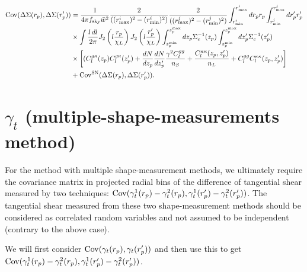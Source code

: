 \documentclass[onecolumn,amsmath,aps,fleqn, superscriptaddress]{revtex4}
\begin{document}
\begin{align}
{\rm Cov}(\Delta \Sigma(r_p), \Delta \Sigma(r_p^\prime)) &= \frac{1}{4\pi f_{\rm sky}\bar{w}^2}\frac{2}{((r^i_{\rm max})^2 - (r^i_{\rm min})^2)}\frac{2}{((r^j_{\rm max})^2 - (r^j_{\rm min})^2)} \int_{r^i_{\rm min}}^{r^i_{\rm max}} dr_p r_p \int_{r^j_{\rm min}}^{r^j_{\rm max}} dr_p^\prime r_p^\prime \nonumber \\ &\times\int \frac{l \, dl}{2\pi} J_2\left(l \frac{r_p}{\chi_L}\right) J_2 \left(l \frac{r_p^\prime}{\chi_L}\right) \int_{z_p^{\rm min}}^{z_p^{\rm max}} d z_p \Sigma_c^{-1}(z_p) \int_{z_p^{\rm min}}^{z_p^{\rm max}} dz_p^\prime \Sigma_c^{-1}(z_p^\prime)\nonumber \\ &\times \left[ (C_l^{g \kappa}(z_p)C_l^{g \kappa}(z_p^\prime)  + \frac{dN}{dz_p}\frac{dN}{dz_p^\prime}\frac{ \gamma^2 C_l^{gg}}{n_S} + \frac{C_l^{\kappa \kappa}(z_p, z_p^\prime)}{n_L} + C_l^{gg} C_l^{\kappa \kappa}(z_p, z_p^\prime)\right]\nonumber \\  &+ {\rm Cov}^{\rm SN}(\Delta \Sigma(r_p), \Delta \Sigma(r_p^\prime)).
\label{covDSDS_rpavg}
\end{align}

\section{$\gamma_t$ (multiple-shape-measurements method)}
For the method with multiple shape-measurement methods, we ultimately require the covariance matrix in projected radial bins of the difference of tangential shear measured by two techniques: ${\rm Cov}(\gamma_t^1(r_p) - \gamma_t^2(r_p), \gamma_t^1(r_p^\prime) - \gamma_t^2(r_p^\prime))$. The tangential shear measured from these two shape-measurement methods should be considered as correlated random variables and not assumed to be independent (contrary to the above case).

We will first consider ${\rm Cov}(\gamma_t(r_p), \gamma_t(r_p^\prime))$ and then use this to get ${\rm Cov}(\gamma_t^1(r_p) - \gamma_t^2(r_p), \gamma_t^1(r_p^\prime) - \gamma_t^2(r_p^\prime))$.
\end{document}
